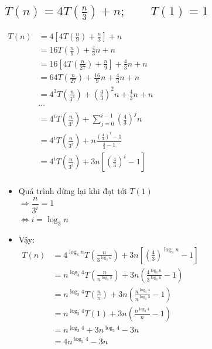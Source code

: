 \documentclass[12pt, letterpaper]{article}
\begin{document}
\subsection{$ T(n) = 4T(\frac{n}{3}) + n; \quad \quad T(1) = 1 $}
$ \begin{aligned}
    T(n) &= 4[4T(\frac{n}{9}) + \frac{n}{3}] + n \\
        &= 16T(\frac{n}{9}) + \frac{4}{3}n + n \\
        &= 16[4T(\frac{n}{27}) + \frac{n}{9}] + \frac{4}{3}n + n \\
        &= 64T(\frac{n}{27}) + \frac{16}{9}n + \frac{4}{3}n + n \\
        &= 4^3T(\frac{n}{3^3}) + {(\frac{4}{3})}^2n + \frac{4}{3}n + n \\
        &\cdots \\
        &= 4^{i}T(\frac{n}{3^i}) + \sum_{j = 0}^{i - 1}{(\frac{4}{3})}^j n \\
        &= 4^{i}T(\frac{n}{3^i}) + n \frac{{(\frac{4}{3})}^i - 1}{\frac{4}{3} - 1}\\
        &= 4^{i}T(\frac{n}{3^i}) + 3n[{(\frac{4}{3})}^i - 1] \\
\end{aligned} $

\begin{itemize}[label=-]
    \item Quá trình dừng lại khi đạt tới $ T(1) $ \\
        $ \Rightarrow \dfrac{n}{3^i} = 1 $ \\
        $ \Leftrightarrow i = \log_3n $
    \item Vậy:\\
        $ \begin{aligned}
            T(n) &= 4^{\log_3n} T(\frac{n}{3^{\log_3n}}) + 3n[{(\frac{4}{3})}^{\log_3n} - 1] \\
                &= n^{\log_3 4} T(\frac{n}{n^{\log_3 3}}) + 3n(\frac{4^{\log_3 n}}{3^{\log_3 n}} - 1) \\
                &= n^{\log_3 4} T(\frac{n}{n}) + 3n(\frac{n^{\log_3 4}}{n^{\log_3 3}} - 1) \\
                &= n^{\log_3 4} T(1) + 3n(\frac{n^{\log_3 4}}{n} - 1) \\
                &= n^{\log_3 4} + 3n^{\log_3 4} - 3n \\
                &= 4n^{\log_3 4} - 3n \\
        \end{aligned} $
\end{itemize}
\end{document}
